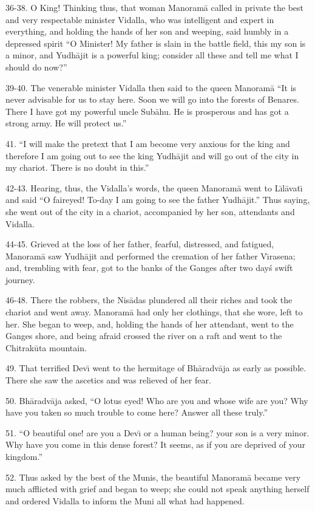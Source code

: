 36-38. O King! Thinking thus, that woman Manoram\=a called in private the best and very respectable minister Vidalla, who was intelligent and expert in everything, and holding the hands of her son and weeping, said humbly in a depressed spirit ``O Minister! My father is slain in the battle field, this my son is a minor, and Yudh\=ajit is a powerful king; consider all these and tell me what I should do now?''

39-40. The venerable minister Vidalla then said to the queen Manoram\=a ``It is never advisable for us to stay here. Soon we will go into the forests of Benares. There I have got my powerful uncle Sub\=ahu. He is prosperous and has got a strong army. He will protect us.''

41. ``I will make the pretext that I am become very anxious for the king and therefore I am going out to see the king Yudh\=ajit and will go out of the city in my chariot. There is no doubt in this.''

42-43. Hearing, thus, the Vidalla's words, the queen Manoram\=a went to L\={\i}l\=avat\={\i} and said ``O faireyed! To-day I am going to see the father Yudh\=ajit.'' Thus saying, she went out of the city in a chariot, accompanied by her son, attendants and Vidalla.

44-45. Grieved at the loss of her father, fearful, distressed, and fatigued, Manoram\=a saw Yudh\=ajit and performed the cremation of her father V\={\i}rasena; and, trembling with fear, got to the banks of the Ganges after two day\'s swift journey.

46-48. There the robbers, the Nis\=adas plundered all their riches and took the chariot and went away. Manoram\=a had only her clothings, that she wore, left to her. She began to weep, and, holding the hands of her attendant, went to the Ganges shore, and being afraid crossed the river on a raft and went to the Chitrak\=uta mountain.

49. That terrified Dev\={\i} went to the hermitage of Bh\=aradv\=aja as early as possible. There she saw the ascetics and was relieved of her fear.

50. Bh\=aradv\=aja asked, ``O lotus eyed! Who are you and whose wife are you? Why have you taken so much trouble to come here? Answer all these truly.''

51. ``O beautiful one! are you a Dev\={\i} or a human being? your son is a very minor. Why have you come in this dense forest? It seems, as if you are deprived of your kingdom.''

52. Thus asked by the best of the Munis, the beautiful Manoram\=a became very much afflicted with grief and began to weep; she could not speak anything herself and ordered Vidalla to inform the Muni all what had happened.

